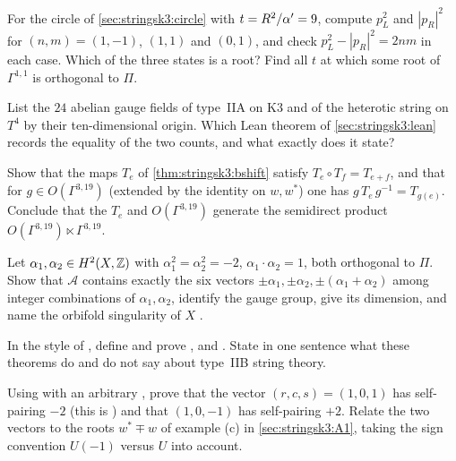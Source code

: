 \begin{exercise}[$\star$]\label{exo:stringsk3:circle}
For the circle of \cref{sec:stringsk3:circle} with $t=R^2/\alpha'=9$, compute $p_L^2$ and $|p_R|^2$
for $(n,m)=(1,-1)$, $(1,1)$ and $(0,1)$, and check $p_L^2-|p_R|^2=2nm$ in each case. Which of the
three states is a root? Find all $t$ at which some root of $\Gamma^{1,1}$ is orthogonal to $\Pi$.
\end{exercise}

\begin{exercise}[$\star$]\label{exo:stringsk3:gauge}
List the $24$ abelian gauge fields of type~IIA on K3 and of the heterotic string on $T^4$ by
their ten-dimensional origin. Which Lean theorem of \cref{sec:stringsk3:lean} records the
equality of the two counts, and what exactly does it state?
\end{exercise}

\begin{exercise}[$\star\star$]\label{exo:stringsk3:group}
Show that the maps $T_e$ of \cref{thm:stringsk3:bshift} satisfy $T_e\circ T_f=T_{e+f}$, and that
for $g\in O(\Gamma^{3,19})$ (extended by the identity on $w,w^*$) one has
$g\,T_e\,g^{-1}=T_{g(e)}$. Conclude that the $T_e$ and $O(\Gamma^{3,19})$ generate the semidirect
product $O(\Gamma^{3,19})\ltimes\Gamma^{3,19}$.
\end{exercise}

\begin{exercise}[$\star\star$]\label{exo:stringsk3:A2}
Let $\alpha_1,\alpha_2\in H^2(X,\mathbb{Z})$ with $\alpha_1^2=\alpha_2^2=-2$, $\alpha_1\cdot\alpha_2=1$, both
orthogonal to $\Pi$. Show that $\mathcal A$ contains exactly the six vectors
$\pm\alpha_1,\pm\alpha_2,\pm(\alpha_1+\alpha_2)$ among integer combinations of $\alpha_1,\alpha_2$,
identify the gauge group, give its dimension, and name the orbifold singularity of $X$
.
\end{exercise}

\begin{exercise}\label{exo:stringsk3:leansig}
In the style of , define  and
prove ,  and . State in
one sentence what these theorems do and do not say about type~IIB string theory.
\end{exercise}

\begin{exercise}\label{exo:stringsk3:leanroot}
Using  with an arbitrary , prove that the vector
$(r,c,s)=(1,0,1)$ has self-pairing $-2$ (this is ) and that
$(1,0,-1)$ has self-pairing $+2$. Relate the two vectors to the roots $w^*\mp w$ of example (c)
in \cref{sec:stringsk3:A1}, taking the sign convention $U(-1)$ versus $U$ into account.
\end{exercise}

